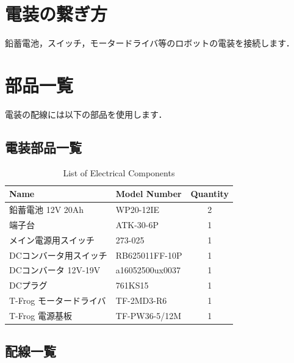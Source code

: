 \documentclass[{../../master}]{subfiles}
\begin{document}
  \section{電装の繋ぎ方}

  鉛蓄電池，スイッチ，モータードライバ等のロボットの電装を接続します．

  \section{部品一覧}
  
  電装の配線には以下の部品を使用します．

  \subsection{電装部品一覧}

  \begin{table}[ht]
    \begin{center}
      \begin{tabular}{|l|l|c|}
        \hline
          Name & Model Number & Quantity \\ \hline
          鉛蓄電池 12V 20Ah & WP20-12IE & 2 \\ \hline
          端子台 & ATK-30-6P & 1  \\ \hline
          メイン電源用スイッチ & 273-025 & 1  \\ \hline
          DCコンバータ用スイッチ & RB625011FF-10P & 1  \\ \hline
          DCコンバータ 12V-19V & a16052500ux0037 & 1  \\ \hline
          DCプラグ & 761KS15 & 1  \\ \hline
          T-Frog モータードライバ & TF-2MD3-R6 & 1  \\ \hline
          T-Frog 電源基板 & TF-PW36-5/12M & 1  \\ \hline
        \end{tabular}
    \end{center}
    \caption{List of Electrical Components}
    \label{tab:list_of_electrical_components}
  \end{table}

  \subsection{配線一覧}
\end{document}
